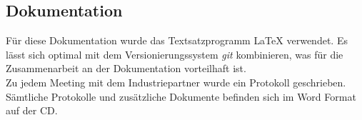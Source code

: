 \subsection{Dokumentation}
Für diese Dokumentation wurde das Textsatzprogramm {\LaTeX} verwendet. Es lässt sich optimal mit dem Versionierungssystem \textit{\gls{git}} kombinieren, was für die Zusammenarbeit an der Dokumentation vorteilhaft ist.
\\

Zu jedem Meeting mit dem Industriepartner wurde ein Protokoll geschrieben. Sämtliche Protokolle und zusätzliche Dokumente befinden sich im Word Format auf der CD.